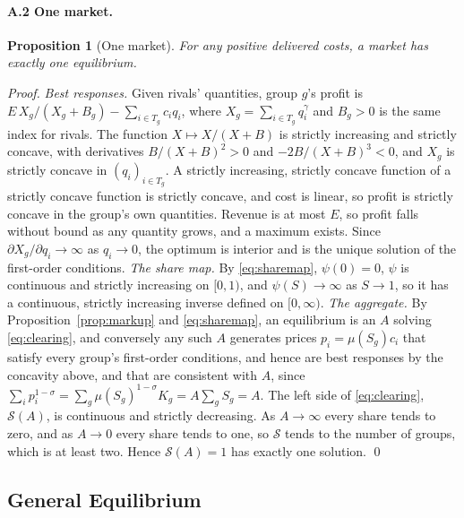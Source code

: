\documentclass[11pt]{article}
\newtheorem{proposition}{Proposition}
\begin{document}
\paragraph{A.2 One market.}\leavevmode
\begin{proposition}[One market]\label{prop:market}
For any positive delivered costs, a market has exactly one equilibrium.
\end{proposition}
\noindent\emph{Proof.} \emph{Best responses.} Given
rivals' quantities, group $g$'s profit is $E\,X_g/(X_g+B_g)-\sum_{i\in T_g}c_iq_i$,
where $X_g=\sum_{i\in T_g}q_i^\gamma$ and $B_g>0$ is the same index for rivals. The
function $X\mapsto X/(X+B)$ is strictly increasing and strictly concave, with
derivatives $B/(X+B)^2>0$ and $-2B/(X+B)^3<0$, and $X_g$ is strictly concave in
$(q_i)_{i\in T_g}$. A strictly increasing, strictly concave function of a strictly
concave function is strictly concave, and cost is linear, so profit is strictly concave
in the group's own quantities. Revenue is at most $E$, so profit falls without bound as
any quantity grows, and a maximum exists. Since $\partial X_g/\partial q_i\to\infty$ as
$q_i\to0$,
the optimum is interior and is the unique solution of the first-order conditions.
\emph{The share map.} By \eqref{eq:sharemap}, $\psi(0)=0$, $\psi$ is continuous and
strictly increasing on $[0,1)$, and $\psi(S)\to\infty$ as $S\to1$, so it has a
continuous, strictly increasing inverse defined on $[0,\infty)$. \emph{The aggregate.}
By Proposition~\ref{prop:markup} and \eqref{eq:sharemap}, an equilibrium is an $A$
solving \eqref{eq:clearing}, and conversely any such $A$ generates prices
$p_i=\mu(S_g)c_i$ that satisfy every group's first-order conditions, and hence are best
responses by the concavity above, and that are consistent with $A$, since $\sum_ip_i^{1-\sigma}=\sum_g\mu(S_g)^{1-\sigma}K_g=A\sum_gS_g=A$. The
left side of \eqref{eq:clearing}, $\mathcal S(A)$, is continuous and strictly
decreasing. As $A\to\infty$ every share tends to zero, and as $A\to0$ every share tends
to one, so $\mathcal S$ tends to the number of groups, which is at least two. Hence
$\mathcal S(A)=1$ has exactly one solution. \qed

\subsection{General Equilibrium}
\label{app:ge}
\end{document}

